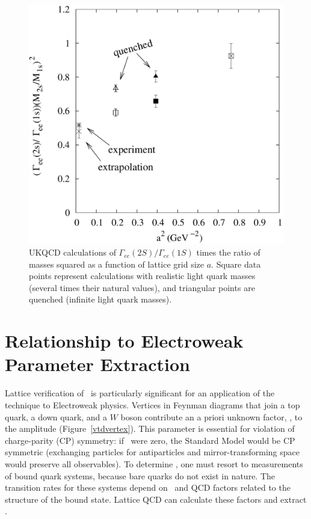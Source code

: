 \documentclass{cornell}
\begin{document}
\begin{figure}[p]
  \begin{center}
    \includegraphics[width=\linewidth]{plots/latticespacing}
  \end{center}
  \caption{\label{latticespacing} UKQCD calculations of
  $\Gamma_{ee}(2S)/\Gamma_{ee}(1S)$ times the ratio of masses squared
  as a function of lattice grid size $a$.  Square data points
  represent calculations with realistic light quark masses (several
  times their natural values), and triangular points are quenched
  (infinite light quark masses).}
\end{figure}

\section{Relationship to Electroweak Parameter Extraction}

Lattice verification of \gee\ is particularly significant for an
application of the technique to Electroweak physics.  Vertices in
Feynman diagrams that join a top quark, a down quark, and a $W$ boson
contribute an a priori unknown factor, \vtd, to the amplitude (Figure~\ref{vtdvertex}).  This parameter is essential for violation of
charge-parity (CP) symmetry: if \vtd\ were zero, the Standard Model
would be CP symmetric (exchanging particles for antiparticles and
mirror-transforming space would preserve all observables).  To
determine \vtd, one must resort to measurements of bound quark
systems, because bare quarks do not exist in nature.  The transition
rates for these systems depend on \vtd\ and QCD factors related to the
structure of the bound state.  Lattice QCD can calculate these
factors and extract \vtd.
\end{document}
